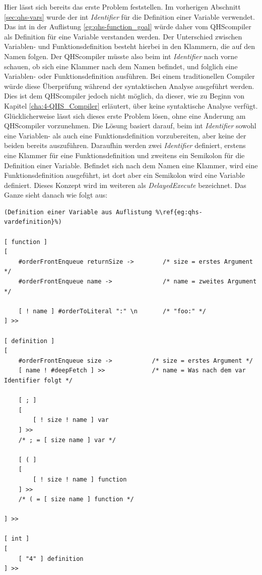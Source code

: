 Hier lässt sich bereits das erste Problem feststellen. Im vorherigen Abschnitt \ref{sec:qhs-vars} wurde der {\selectListingFont int} \textit{Identifier} für die Definition einer Variable verwendet. 
Das {\selectListingFont int} in der Auflistung \ref{eg:qhs-function_goal} würde daher vom QHScompiler als Definition für eine Variable verstanden werden.
Der Unterschied zwischen Variablen- und Funktionsdefinition besteht hierbei in den Klammern, die auf den Namen folgen.
Der QHScompiler müsste also beim {\selectListingFont int} \textit{Identifier} nach vorne schauen, ob sich eine Klammer nach dem Namen befindet, und folglich eine Variablen- oder Funktionsdefinition ausführen.
Bei einem traditionellen Compiler würde diese Überprüfung während der syntaktischen Analyse ausgeführt werden.
Dies ist dem QHScompiler jedoch nicht möglich, da dieser, wie zu Beginn von Kapitel \ref{cha:4-QHS_Compiler} erläutert, über keine syntaktische Analyse verfügt.
Glücklicherweise lässt sich dieses erste Problem lösen, ohne eine Änderung am QHScompiler vorzunehmen.
Die Lösung basiert darauf, beim {\selectListingFont int} \textit{Identifier} sowohl eine Variablen- als auch eine Funktionsdefinition vorzubereiten, aber keine der beiden bereits auszuführen.
Daraufhin werden zwei \textit{Identifier} definiert, erstens eine Klammer für eine Funktionsdefinition und zweitens ein Semikolon für die Definition einer Variable.
Befindet sich nach dem Namen eine Klammer, wird eine Funktionsdefinition ausgeführt, ist dort aber ein Semikolon wird eine Variable definiert.
Dieses Konzept wird im weiteren als \textit{DelayedExecute} bezeichnet. Das Ganze sieht danach wie folgt aus:

\begin{minipage}{\linewidth}
\begin{lstlisting}[language=QHS, caption=Implementation eines \textit{DelayedExecute} für Definitionen]
(Definition einer Variable aus Auflistung %\ref{eg:qhs-vardefinition}%)

[ function ]
[
    #orderFrontEnqueue returnSize ->        /* size = erstes Argument */
    #orderFrontEnqueue name ->              /* name = zweites Argument */

    [ ! name ] #orderToLiteral ":" \n       /* "foo:" */
] >>

[ definition ]
[
    #orderFrontEnqueue size ->           /* size = erstes Argument */
    [ name ! #deepFetch ] >>             /* name = Was nach dem var Identifier folgt */

    [ ; ]
    [
        [ ! size ! name ] var 
    ] >>
    /* ; = [ size name ] var */

    [ ( ]
    [
        [ ! size ! name ] function 
    ] >>
    /* ( = [ size name ] function */

] >>

[ int ]
[
    [ "4" ] definition
] >>
\end{lstlisting}
\end{minipage}


